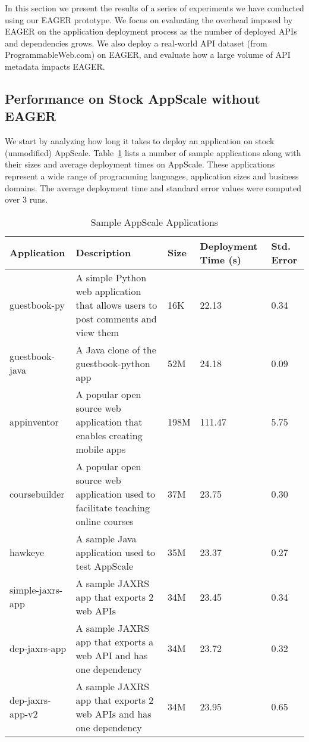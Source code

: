In this section we present the results of a series of experiments we have conducted using our EAGER prototype. We focus
on evaluating the overhead imposed by EAGER on the application deployment process as the number of deployed APIs and dependencies
grows. We also deploy a real-world API dataset (from ProgrammableWeb.com) on EAGER, and evaluate how a large 
volume of API metadata impacts EAGER.

\subsection{Performance on Stock AppScale without EAGER}
We start by analyzing how long it takes to deploy an application on stock (unmodified)
AppScale. Table~\ref{tab:sample_apps} lists a number of sample applications along with their sizes and average deployment times on AppScale.
These applications represent a wide range of programming languages, application sizes and business domains. The average
deployment time and standard error values were computed over 3 runs.

\begin{table}[ht]
\begin{center}
\begin{tabular}{| p{1.5cm} | p{3cm} | p{0.5cm} | p{1.1cm} | p{0.6cm} | }
\hline
Application & Description & Size & Deployment Time (s) & Std. Error\\ \hline
guestbook-py & A simple Python web application that allows users to post comments and view them & 16K & 22.13 & 0.34 \\ \hline
guestbook-java & A Java clone of the guestbook-python app & 52M & 24.18 & 0.09 \\ \hline
appinventor & A popular open source web application that enables creating mobile apps & 198M & 111.47 & 5.75 \\ \hline
coursebuilder & A popular open source web application used to facilitate teaching online courses & 37M & 23.75 & 0.30 \\ \hline
hawkeye & A sample Java application used to test AppScale & 35M & 23.37 & 0.27 \\ \hline
simple-jaxrs-app & A sample JAXRS app that exports 2 web APIs & 34M & 23.45 & 0.34 \\ \hline
dep-jaxrs-app & A sample JAXRS app that exports a web API and has one dependency & 34M & 23.72 & 0.32 \\ \hline
dep-jaxrs-app-v2 & A sample JAXRS app that exports 2 web APIs and has one dependency & 34M & 23.95 & 0.65 \\ \hline
\end{tabular}
\end{center}
\caption{Sample AppScale Applications}
\label{tab:sample_apps}
\end{table}

